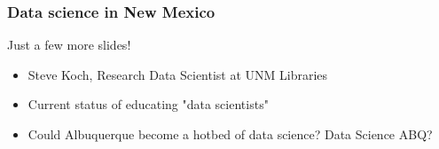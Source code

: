 
\begin{frame}
\frametitle{Data science in New Mexico}
\begin{center}

\begin{block}{Just a few more slides!}
\begin{itemize}
    \item Steve Koch, Research Data Scientist at UNM Libraries
	\item Current status of educating "data scientists"
	\item Could Albuquerque become a hotbed of data science? Data Science ABQ? 
\end{itemize}
\end{block}


\end{center}
\end{frame}


